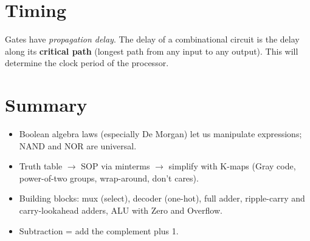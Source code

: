 \section{Timing}

Gates have \emph{propagation delay}. The delay of a combinational circuit is
the delay along its \textbf{critical path} (longest path from any input to
any output). This will determine the clock period of the processor.

\section*{Summary}
\begin{itemize}
  \item Boolean algebra laws (especially De Morgan) let us manipulate
    expressions; NAND and NOR are universal.
  \item Truth table $\to$ SOP via minterms $\to$ simplify with K-maps
    (Gray code, power-of-two groups, wrap-around, don't cares).
  \item Building blocks: mux (select), decoder (one-hot), full adder,
    ripple-carry and carry-lookahead adders, ALU with Zero and Overflow.
  \item Subtraction = add the complement plus 1.
\end{itemize}
